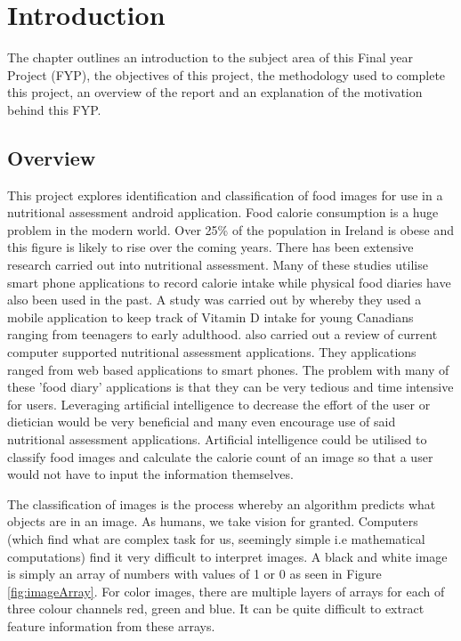 \chapter{Introduction}
\label{intro}
The chapter outlines an introduction to the subject area of this Final year Project (FYP), the objectives of this project, the methodology used to complete this project, an overview of the report and an explanation of the motivation behind this FYP.

\section{Overview}
This project explores identification and classification of food images for use in a nutritional assessment android application.
Food calorie consumption is a huge problem in the modern world.
Over 25\% of the population in Ireland is obese and this figure is likely to rise over the coming years.
There has been extensive research carried out into nutritional assessment.
Many of these studies utilise smart phone applications to record calorie intake while physical food diaries have also been used in the past.
A study was carried out by \parencite{goodman2015vitamin} whereby they used a mobile application to keep track of Vitamin D intake for young Canadians ranging from teenagers to early adulthood.
\parencite{arens2015promising} also carried out a review of current computer supported nutritional assessment applications. They applications ranged from web based applications to smart phones.
The problem with many of these 'food diary' applications is that they can be very tedious and time intensive for users.
Leveraging artificial intelligence to decrease the effort of the user or dietician would be very beneficial and many even encourage use of said nutritional assessment applications.
Artificial intelligence could be utilised to classify food images and calculate the calorie count of an image so that a user would not have to input the information themselves.

The classification of images is the process whereby an algorithm predicts what objects are in an image.
As humans, we take vision for granted.
Computers (which find what are complex task for us, seemingly simple i.e mathematical computations) find it very difficult to interpret images.
A black and white image is simply an array of numbers with values of 1 or 0 as seen in Figure \ref{fig:imageArray}. 
For color images, there are multiple layers of arrays for each of three colour channels red, green and blue.
It can be quite difficult to extract feature information from these arrays.

